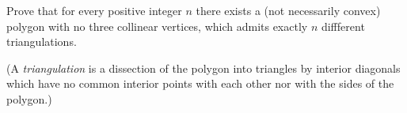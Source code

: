 Prove that for every positive integer $n$ there exists a (not necessarily convex) polygon with no three collinear vertices, which admits exactly $n$ diffferent triangulations.

(A \emph{triangulation} is a dissection of the polygon into triangles by interior diagonals which have no common interior points with each other nor with the sides of the polygon.)